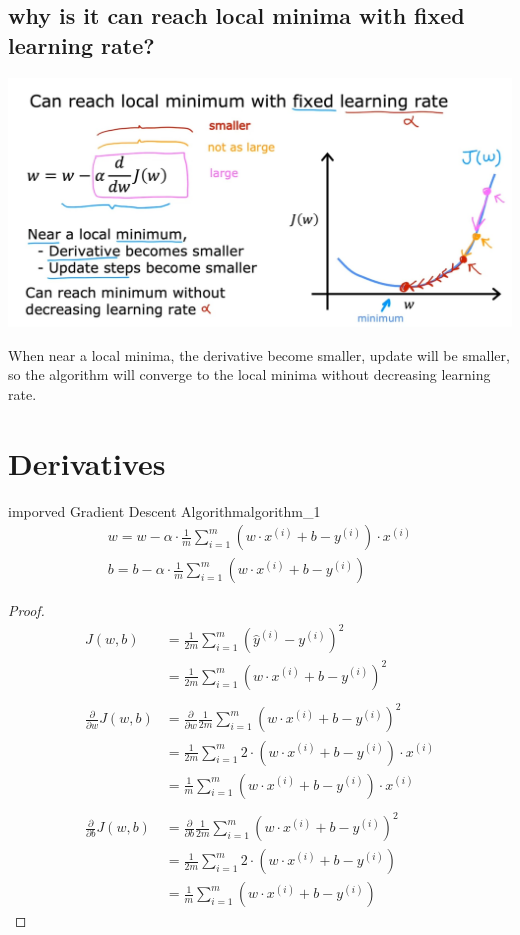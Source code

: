 \subsection*{why is it can reach local minima with fixed learning rate?}
\includegraphics[width=\textwidth]{images/2.3_4}
\begin{notebox}
When near a local minima, %
the derivative become smaller, %
update will be smaller, %
so the algorithm will converge to the local minima %
without decreasing learning rate.
\end{notebox}

\section{Derivatives}
\begin{thmbox}{imporved Gradient Descent Algorithm}{algorithm_1}
\begin{align}
    w = w - \alpha \cdot \frac{1}{m} \sum_{i=1}^{m} (w \cdot x^{(i)} + b - y^{(i)}) \cdot x^{(i)} \\
    b = b - \alpha \cdot \frac{1}{m} \sum_{i=1}^{m} (w \cdot x^{(i)} + b - y^{(i)})
\end{align}
\tcblower
\begin{proof}
    \begin{align*}
        J(w, b)
        &= \frac{1}{2m} \sum_{i=1}^{m} (\hat{y}^{(i)} - y^{(i)})^2\\
        &= \frac{1}{2m} \sum_{i=1}^{m} (w \cdot x^{(i)} + b - y^{(i)})^2\\
        \\
        \frac{\partial}{\partial w} J(w, b)
        &= \frac{\partial}{\partial w} \frac{1}{2m} \sum_{i=1}^{m} (w \cdot x^{(i)} + b - y^{(i)})^2 \\
        &= \frac{1}{2m} \sum_{i=1}^{m} 2 \cdot (w \cdot x^{(i)} + b - y^{(i)}) \cdot x^{(i)} \\
        &= \frac{1}{m} \sum_{i=1}^{m} (w \cdot x^{(i)} + b - y^{(i)}) \cdot x^{(i)} \\
        \\
        \frac{\partial}{\partial b} J(w, b)
        &= \frac{\partial}{\partial b} \frac{1}{2m} \sum_{i=1}^{m} (w \cdot x^{(i)} + b - y^{(i)})^2 \\
        &= \frac{1}{2m} \sum_{i=1}^{m} 2 \cdot (w \cdot x^{(i)} + b - y^{(i)}) \\
        &= \frac{1}{m} \sum_{i=1}^{m} (w \cdot x^{(i)} + b - y^{(i)})
    \end{align*}
\end{proof}
\end{thmbox}

